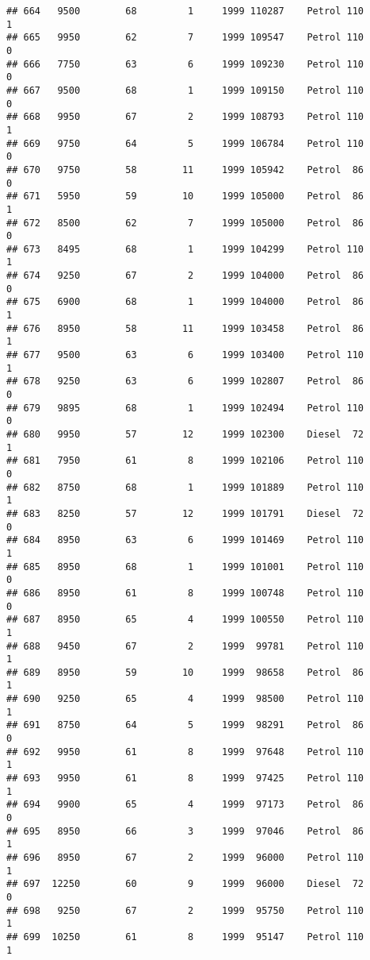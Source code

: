 \documentclass[]{article}
\begin{document}
\begin{verbatim}
## 664   9500        68         1     1999 110287    Petrol 110         1
## 665   9950        62         7     1999 109547    Petrol 110         0
## 666   7750        63         6     1999 109230    Petrol 110         0
## 667   9500        68         1     1999 109150    Petrol 110         0
## 668   9950        67         2     1999 108793    Petrol 110         1
## 669   9750        64         5     1999 106784    Petrol 110         0
## 670   9750        58        11     1999 105942    Petrol  86         0
## 671   5950        59        10     1999 105000    Petrol  86         1
## 672   8500        62         7     1999 105000    Petrol  86         0
## 673   8495        68         1     1999 104299    Petrol 110         1
## 674   9250        67         2     1999 104000    Petrol  86         0
## 675   6900        68         1     1999 104000    Petrol  86         1
## 676   8950        58        11     1999 103458    Petrol  86         1
## 677   9500        63         6     1999 103400    Petrol 110         1
## 678   9250        63         6     1999 102807    Petrol  86         0
## 679   9895        68         1     1999 102494    Petrol 110         0
## 680   9950        57        12     1999 102300    Diesel  72         1
## 681   7950        61         8     1999 102106    Petrol 110         0
## 682   8750        68         1     1999 101889    Petrol 110         1
## 683   8250        57        12     1999 101791    Diesel  72         0
## 684   8950        63         6     1999 101469    Petrol 110         1
## 685   8950        68         1     1999 101001    Petrol 110         0
## 686   8950        61         8     1999 100748    Petrol 110         0
## 687   8950        65         4     1999 100550    Petrol 110         1
## 688   9450        67         2     1999  99781    Petrol 110         1
## 689   8950        59        10     1999  98658    Petrol  86         1
## 690   9250        65         4     1999  98500    Petrol 110         1
## 691   8750        64         5     1999  98291    Petrol  86         0
## 692   9950        61         8     1999  97648    Petrol 110         1
## 693   9950        61         8     1999  97425    Petrol 110         1
## 694   9900        65         4     1999  97173    Petrol  86         0
## 695   8950        66         3     1999  97046    Petrol  86         1
## 696   8950        67         2     1999  96000    Petrol 110         1
## 697  12250        60         9     1999  96000    Diesel  72         0
## 698   9250        67         2     1999  95750    Petrol 110         1
## 699  10250        61         8     1999  95147    Petrol 110         1

\end{verbatim}
\end{document}
